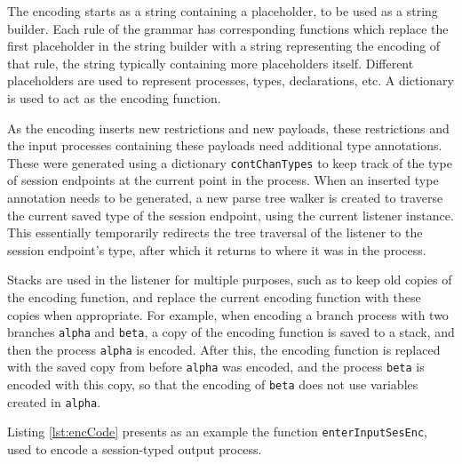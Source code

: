 \documentclass{l4proj}
\begin{document}
\quad The encoding starts as a string containing a placeholder, to be used as a string builder. Each rule of the grammar has corresponding functions which replace the first placeholder in the string builder with a string representing the encoding of that rule, the string typically containing more placeholders itself. Different placeholders are used to represent processes, types, declarations, etc. A dictionary is used to act as the encoding function. 

\quad As the encoding inserts new restrictions and new payloads, these restrictions and the input processes containing these payloads need additional type annotations. These were generated using a dictionary \texttt{contChanTypes} to keep track of the type of session endpoints at the current point in the process. When an inserted type annotation needs to be generated, a new parse tree walker is created to traverse the current saved type of the session endpoint, using the current listener instance. This essentially temporarily redirects the tree traversal of the listener to the session endpoint's type, after which it returns to where it was in the process.

\quad Stacks are used in the listener for multiple purposes, such as to keep old copies of the encoding function, and replace the current encoding function with these copies when appropriate. For example, when encoding a branch process with two branches \texttt{alpha} and \texttt{beta}, a copy of the encoding function is saved to a stack, and then the process \texttt{alpha} is encoded. After this, the encoding function is replaced with the saved copy from before \texttt{alpha} was encoded, and the process \texttt{beta} is encoded with this copy, so that the encoding of \texttt{beta} does not use variables created in \texttt{alpha}.

\quad Listing \ref{lst:encCode} presents as an example the function \texttt{enterInputSesEnc}, used to encode a session-typed output process.
\end{document}
